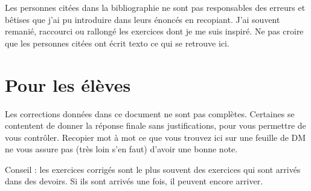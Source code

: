 \begin{remark}
    Les personnes citées dans la bibliographie ne sont pas responsables des erreurs et bêtises que j'ai pu introduire dans leurs énoncés en recopiant. J'ai souvent remanié, raccourci ou rallongé les exercices dont je me suis inspiré. Ne pas croire que les personnes citées ont écrit texto ce qui se retrouve ici.
\end{remark}




\section*{Pour les élèves}

Les corrections données dans ce document ne sont pas complètes. Certaines se contentent de donner la réponse finale sans justifications, pour vous permettre de vous contrôler. Recopier mot à mot ce que vous trouvez ici sur une feuille de DM ne vous assure pas (très loin s'en faut) d'avoir une bonne note.

Conseil : les exercices corrigés sont le plus souvent des exercices qui sont arrivés dans des devoirs. Si ils sont arrivés une fois, il peuvent encore arriver.
